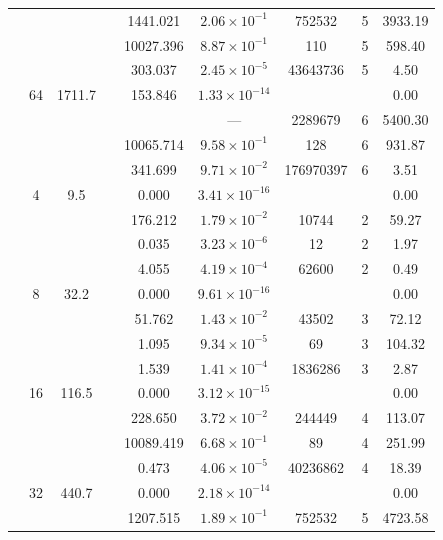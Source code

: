 \begin{table}[htbp]
\begin{tabular}{l S[table-format=3.0] S[table-format=4.1] l S[table-format=3.3] S[table-format=1.2e2] S[table-format=6.0] S[table-format=2.0] S[table-format=4.2]}
     &  &  &  & 1441.021 & $2.06 \times 10^{-1}$ & 752532 & 5 & 3933.19 \\
     &  &  &  & 10027.396 & $8.87 \times 10^{-1}$ & 110 & 5 & 598.40 \\
     &  &  &  & 303.037 & $2.45 \times 10^{-5}$ & 43643736 & 5 & 4.50 \\
     & 64 & 1711.7 &  & 153.846 & $1.33 \times 10^{-14}$ & {\text{---}} & {\text{---}} & 0.00 \\
     &  &  &  & {\text{---}} & ${\text{---}}$ & 2289679 & 6 & 5400.30 \\
     &  &  &  & 10065.714 & $9.58 \times 10^{-1}$ & 128 & 6 & 931.87 \\
     &  &  &  & 341.699 & $9.71 \times 10^{-2}$ & 176970397 & 6 & 3.51 \\
    \midrule
     & 4 & 9.5 &  & 0.000 & $3.41 \times 10^{-16}$ & {\text{---}} & {\text{---}} & 0.00 \\
     &  &  &  & 176.212 & $1.79 \times 10^{-2}$ & 10744 & 2 & 59.27 \\
     &  &  &  & 0.035 & $3.23 \times 10^{-6}$ & 12 & 2 & 1.97 \\
     &  &  &  & 4.055 & $4.19 \times 10^{-4}$ & 62600 & 2 & 0.49 \\
     & 8 & 32.2 &  & 0.000 & $9.61 \times 10^{-16}$ & {\text{---}} & {\text{---}} & 0.00 \\
     &  &  &  & 51.762 & $1.43 \times 10^{-2}$ & 43502 & 3 & 72.12 \\
     &  &  &  & 1.095 & $9.34 \times 10^{-5}$ & 69 & 3 & 104.32 \\
     &  &  &  & 1.539 & $1.41 \times 10^{-4}$ & 1836286 & 3 & 2.87 \\
     & 16 & 116.5 &  & 0.000 & $3.12 \times 10^{-15}$ & {\text{---}} & {\text{---}} & 0.00 \\
     &  &  &  & 228.650 & $3.72 \times 10^{-2}$ & 244449 & 4 & 113.07 \\
     &  &  &  & 10089.419 & $6.68 \times 10^{-1}$ & 89 & 4 & 251.99 \\
     &  &  &  & 0.473 & $4.06 \times 10^{-5}$ & 40236862 & 4 & 18.39 \\
     & 32 & 440.7 &  & 0.000 & $2.18 \times 10^{-14}$ & {\text{---}} & {\text{---}} & 0.00 \\
     &  &  &  & 1207.515 & $1.89 \times 10^{-1}$ & 752532 & 5 & 4723.58 \\

\end{tabular}
\end{table}
